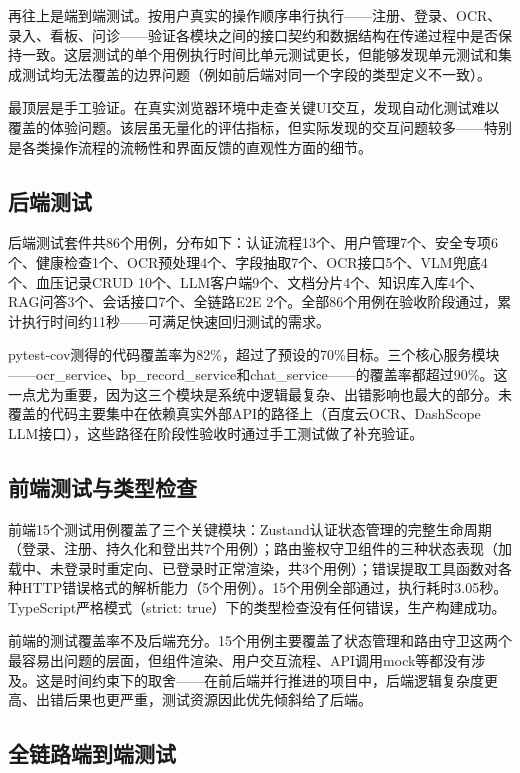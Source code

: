 \documentclass[zihao=-4,a4paper]{ctexart}
\begin{document}
再往上是端到端测试。按用户真实的操作顺序串行执行——注册、登录、OCR、录入、看板、问诊——验证各模块之间的接口契约和数据结构在传递过程中是否保持一致。这层测试的单个用例执行时间比单元测试更长，但能够发现单元测试和集成测试均无法覆盖的边界问题（例如前后端对同一个字段的类型定义不一致）。

最顶层是手工验证。在真实浏览器环境中走查关键UI交互，发现自动化测试难以覆盖的体验问题。该层虽无量化的评估指标，但实际发现的交互问题较多——特别是各类操作流程的流畅性和界面反馈的直观性方面的细节。

\subsection{后端测试}

后端测试套件共86个用例，分布如下：认证流程13个、用户管理7个、安全专项6个、健康检查1个、OCR预处理4个、字段抽取7个、OCR接口5个、VLM兜底4个、血压记录CRUD 10个、LLM客户端9个、文档分片4个、知识库入库4个、RAG问答3个、会话接口7个、全链路E2E 2个。全部86个用例在验收阶段通过，累计执行时间约11秒——可满足快速回归测试的需求。

pytest-cov测得的代码覆盖率为82\%，超过了预设的70\%目标。三个核心服务模块——ocr\_service、bp\_record\_service和chat\_service——的覆盖率都超过90\%。这一点尤为重要，因为这三个模块是系统中逻辑最复杂、出错影响也最大的部分。未覆盖的代码主要集中在依赖真实外部API的路径上（百度云OCR、DashScope LLM接口），这些路径在阶段性验收时通过手工测试做了补充验证。

\subsection{前端测试与类型检查}

前端15个测试用例覆盖了三个关键模块：Zustand认证状态管理的完整生命周期（登录、注册、持久化和登出共7个用例）；路由鉴权守卫组件的三种状态表现（加载中、未登录时重定向、已登录时正常渲染，共3个用例）；错误提取工具函数对各种HTTP错误格式的解析能力（5个用例）。15个用例全部通过，执行耗时3.05秒。TypeScript严格模式（strict: true）下的类型检查没有任何错误，生产构建成功。

前端的测试覆盖率不及后端充分。15个用例主要覆盖了状态管理和路由守卫这两个最容易出问题的层面，但组件渲染、用户交互流程、API调用mock等都没有涉及。这是时间约束下的取舍——在前后端并行推进的项目中，后端逻辑复杂度更高、出错后果也更严重，测试资源因此优先倾斜给了后端。

\subsection{全链路端到端测试}
\end{document}
